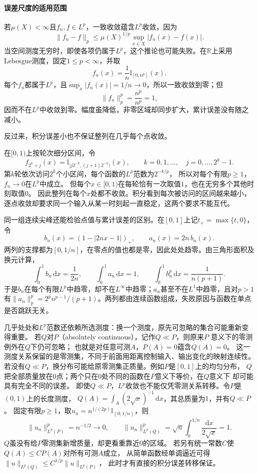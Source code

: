 \paragraph{误差尺度的适用范围}

若$\mu(X)<\infty$且$f_n,f\in L^p$，一致收敛蕴含$L^p$收敛，因为
\[   \lVert f_n-f\rVert_p   \leq   \mu(X)^{1/p}\sup_{x\in X}|f_n(x)-f(x)|. \]
当空间测度无穷时，即使各项仍属于$L^p$，这个推论也可能失败。在$\mathbb R$上采用
Lebesgue测度，固定$1\leq p<\infty$，并取
\[
  f_n(x)=\frac1n\mathbb I_{[0,n^p]}(x).
\]
每个$f_n$都属于$L^p$，且$\sup_x|f_n(x)|=1/n\to0$，所以一致收敛到零；但
\[
  \lVert f_n\rVert_p^p=\frac{n^p}{n^p}=1,
\]
因而不在$L^p$中收敛到零。幅度虽降低，非零区域却同步扩大，累计误差没有随之减小。

反过来，积分误差小也不保证整列在几乎每个点收敛。
\begin{example}[小区间轮流扫过定义域]
\label{ex:analysis-lp-without-ae-limit}
在$[0,1)$上按轮次细分区间，令
\[
 f_{2^k+j}(x)=\mathbb I_{[j2^{-k},(j+1)2^{-k})}(x),
 \qquad k=0,1,\ldots,\quad j=0,\ldots,2^k-1.
\]
第$k$轮依次访问$2^k$个小区间，每个函数的$L^p$范数为$2^{-k/p}$，
所以对每个有限$p\geq1$，$f_n\to0$在$L^p$中成立。
但每个$x\in[0,1)$在每轮恰有一次取值$1$，也在无穷多个其他时刻取值$0$。
因此整列在每个$x$处都不收敛。积分看到每次被访问的区间越来越小，
逐点收敛却要求同一个输入从某一时刻起一直稳定，这两个要求不能互代。
\end{example}

同一组连续尖峰还能检验点值与累计误差的区别。在$[0,1]$上记$t_+=\max\{t,0\}$，令
\begin{equation}
 b_n(x)=(1-|2nx-1|)_+,\qquad a_n(x)=2n\,b_n(x).
\label{eq:measurable-continuous-spikes}
\end{equation}
两列的支撑都为$[0,1/n]$，在零点的值也都是零，因此处处趋零。由三角形面积及换元计算，
\[
 \int_0^1b_n\,\mathrm dx=\frac1{2n},\qquad
 \int_0^1a_n\,\mathrm dx=1,\qquad
 \int_0^1b_n^p\,\mathrm dx=\frac1{n(p+1)}.
\]
于是$b_n$在每个有限$L^p$中趋零，却不在$L^\infty$中趋零；$a_n$甚至不在$L^1$中趋零，且对$p>1$有$\lVert a_n\rVert_p^p=2^pn^{p-1}/(p+1)$。两列都由连续函数组成，失败原因与函数在单点是否跳跃无关。

几乎处处和$L^p$范数还依赖所选测度：换一个测度，原先可忽略的集合可能重新变得重要。
若$Q$对$P$（absolutely continuous），记作$Q\ll P$，则原来$P$
意义下的零测例外在$Q$下仍可忽略；
也就是对任意可测$A$，$P(A)=0$蕴含$Q(A)=0$。
这一测度关系保留的是零测集，不同于前面用距离控制输入、输出变化的映射连续性。
若没有$Q\ll P$，换分布可能给原零测集正质量。例如$P$是$[0,1]$上的均匀分布，
$Q$把全部质量放在$0$点；两个只在$0$处不同的函数在$P$意义下等价，在$Q$意义下
却可能具有完全不同的误差。
即使$Q\ll P$，$L^p$收敛也不能仅凭零测关系转移。令$P$是$(0,1)$上的长度测度，
$Q(A)=\int_A(2\sqrt x)^{-1}\,\mathrm dx$，其总质量为$1$，并有$Q\ll P$。
固定有限$p\geq1$，取$u_n=n^{1/(2p)}\mathbb I_{(0,1/n)}$，则
\[
 \lVert u_n\rVert_{L^p(P)}^p=n^{-1/2}\to0,\qquad
 \lVert u_n\rVert_{L^p(Q)}^p
 =\sqrt n\int_0^{1/n}\frac{\mathrm dx}{2\sqrt x}=1.
\]
$Q$虽没有给$P$零测集新增质量，却更看重靠近$0$的区域。
若另有统一常数$C$使$Q(A)\leq CP(A)$对所有可测$A$成立，
从简单函数经单调逼近可得$\lVert u\rVert_{L^p(Q)}
\leq C^{1/p}\lVert u\rVert_{L^p(P)}$，
此时才有直接的积分误差转移保证。

